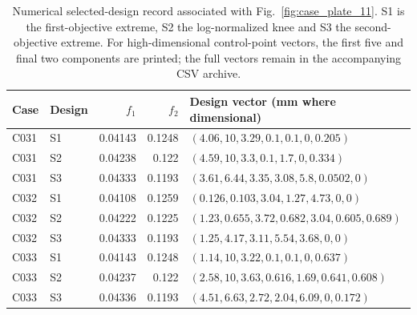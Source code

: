 \begin{table}[p]
\centering\scriptsize
\caption{Numerical selected-design record associated with Fig.~\ref{fig:case_plate_11}. S1 is the first-objective extreme, S2 the log-normalized knee and S3 the second-objective extreme. For high-dimensional control-point vectors, the first five and final two components are printed; the full vectors remain in the accompanying CSV archive.}
\label{tab:case_plate_11}
\setlength{\tabcolsep}{3.2pt}
\begin{tabularx}{\textwidth}{llrr>{\raggedright\arraybackslash}X}
\toprule Case & Design & $f_1$ & $f_2$ & Design vector (mm where dimensional) \\
\midrule
C031 & S1 & 0.04143 & 0.1248 & $(4.06, 10, 3.29, 0.1, 0.1, 0, 0.205)$ \\
C031 & S2 & 0.04238 & 0.122 & $(4.59, 10, 3.3, 0.1, 1.7, 0, 0.334)$ \\
C031 & S3 & 0.04333 & 0.1193 & $(3.61, 6.44, 3.35, 3.08, 5.8, 0.0502, 0)$ \\
C032 & S1 & 0.04108 & 0.1259 & $(0.126, 0.103, 3.04, 1.27, 4.73, 0, 0)$ \\
C032 & S2 & 0.04222 & 0.1225 & $(1.23, 0.655, 3.72, 0.682, 3.04, 0.605, 0.689)$ \\
C032 & S3 & 0.04333 & 0.1193 & $(1.25, 4.17, 3.11, 5.54, 3.68, 0, 0)$ \\
C033 & S1 & 0.04143 & 0.1248 & $(1.14, 10, 3.22, 0.1, 0.1, 0, 0.637)$ \\
C033 & S2 & 0.04237 & 0.122 & $(2.58, 10, 3.63, 0.616, 1.69, 0.641, 0.608)$ \\
C033 & S3 & 0.04336 & 0.1193 & $(4.51, 6.63, 2.72, 2.04, 6.09, 0, 0.172)$ \\
\bottomrule
\end{tabularx}
\end{table}
